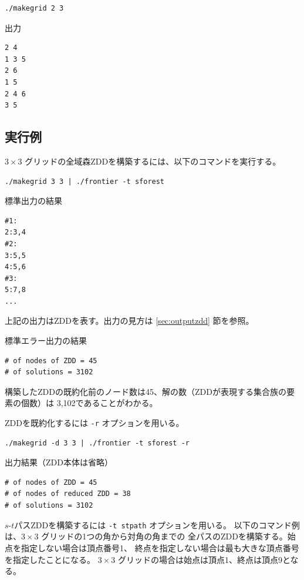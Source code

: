 \documentclass{jsarticle}
\begin{document}
\begin{verbatim}
./makegrid 2 3
\end{verbatim}

出力

\begin{verbatim}
2 4
1 3 5
2 6
1 5
2 4 6
3 5
\end{verbatim}

\subsection{実行例}

$3 \times 3$ グリッドの全域森ZDDを構築するには、以下のコマンドを実行する。

\begin{verbatim}
./makegrid 3 3 | ./frontier -t sforest
\end{verbatim}

標準出力の結果

\begin{verbatim}
#1:
2:3,4
#2:
3:5,5
4:5,6
#3:
5:7,8
...
\end{verbatim}

上記の出力はZDDを表す。出力の見方は \ref{sec:outputzdd} 節を参照。

標準エラー出力の結果

\begin{verbatim}
# of nodes of ZDD = 45
# of solutions = 3102
\end{verbatim}

構築したZDDの既約化前のノード数は45、解の数（ZDDが表現する集合族の要素の個数）は
3,102であることがわかる。

ZDDを既約化するには \texttt{-r} オプションを用いる。

\begin{verbatim}
./makegrid -d 3 3 | ./frontier -t sforest -r
\end{verbatim}

出力結果（ZDD本体は省略）

\begin{verbatim}
# of nodes of ZDD = 45
# of nodes of reduced ZDD = 38
# of solutions = 3102
\end{verbatim}

$s$-$t$パスZDDを構築するには \texttt{-t stpath} オプションを用いる。
以下のコマンド例は、$3 \times 3$ グリッドの1つの角から対角の角までの
全パスのZDDを構築する。始点を指定しない場合は頂点番号1、
終点を指定しない場合は最も大きな頂点番号を指定したことになる。
$3 \times 3$ グリッドの場合は始点は頂点1、終点は頂点9となる。
\end{document}
